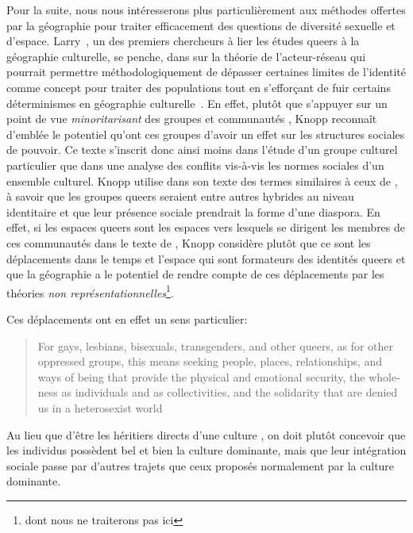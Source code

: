 Pour la suite, nous nous intéresserons plus particulièrement aux méthodes offertes par la géographie pour traiter efficacement des questions de diversité sexuelle et d'espace. 
Larry~\citet{Knopp2004}, un des premiers chercheurs à lier les études queers à la géographie culturelle, se penche, dans  sur la théorie de l'acteur-réseau qui pourrait permettre méthodologiquement de dépasser certaines limites de l'identité comme concept pour traiter des populations \lgbt{} tout en s’efforçant de fuir certains déterminismes en géographie culturelle~\citep{Knopp2004}. 
En effet, plutôt que s'appuyer sur un point de vue \emph{minoritarisant} des groupes et communautés \lgbt{}, Knopp reconnaît d'emblée le potentiel qu'ont ces groupes d'avoir un effet sur les structures sociales de pouvoir. 
Ce texte s'inscrit donc ainsi moins dans l'étude d'un groupe culturel particulier que dans une analyse des conflits vis-à-vis les normes sociales d'un ensemble culturel. 
Knopp utilise dans son texte des termes similaires à ceux de \citet{Sinfield1996}, à savoir que les groupes queers seraient entre autres hybrides au niveau identitaire et que leur présence sociale prendrait la forme d'une diaspora. 
En effet, si les espaces queers sont les espaces vers lesquels se dirigent les membres de ces communautés dans le texte de \citet{Sinfield1996}, Knopp considère plutôt que ce sont les déplacements dans le temps et l'espace qui sont formateurs des identités queers et que la géographie a le potentiel de rendre compte de ces déplacements par les théories \emph{non représentationnelles}\footnote{dont nous ne traiterons pas ici}.

Ces déplacements ont en effet un sens particulier: \foreignblockquote{english}[{\cite[123]{Knopp2004}}][.]{For gays, lesbians, bisexuals, transgenders, and other queers, as for other oppressed groups, this means seeking people, places, relationships, and ways of being that provide the physical and emotional security, the wholeness as individuals and as collectivities, and the solidarity that are denied us in a heterosexist world}
Au lieu que d'être les héritiers directs d'une culture \qu{}, on doit plutôt concevoir que les individus \qus{} possèdent bel et bien la culture dominante, mais que leur intégration sociale passe par d'autres trajets que ceux proposés normalement par la culture dominante.

